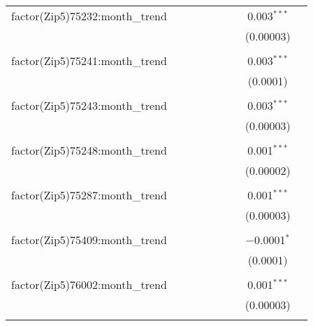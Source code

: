 \begin{table}[H]
{\begin{tabular}{@{\extracolsep{5pt}}lcccccccc}
  factor(Zip5)75232:month\_trend &  &  &  &  &  &  & 0.003$^{***}$ &  \\  

   &  &  &  &  &  &  & (0.00003) &  \\  

   & & & & & & & & \\  

  factor(Zip5)75241:month\_trend &  &  &  &  &  &  & 0.003$^{***}$ &  \\  

   &  &  &  &  &  &  & (0.0001) &  \\  

   & & & & & & & & \\  

  factor(Zip5)75243:month\_trend &  &  &  &  &  &  & 0.003$^{***}$ &  \\  

   &  &  &  &  &  &  & (0.00003) &  \\  

   & & & & & & & & \\  

  factor(Zip5)75248:month\_trend &  &  &  &  &  &  & 0.001$^{***}$ &  \\  

   &  &  &  &  &  &  & (0.00002) &  \\  

   & & & & & & & & \\  

  factor(Zip5)75287:month\_trend &  &  &  &  &  &  & 0.001$^{***}$ &  \\  

   &  &  &  &  &  &  & (0.00003) &  \\  

   & & & & & & & & \\  

  factor(Zip5)75409:month\_trend &  &  &  &  &  &  & $-$0.0001$^{*}$ &  \\  

   &  &  &  &  &  &  & (0.0001) &  \\  

   & & & & & & & & \\  

  factor(Zip5)76002:month\_trend &  &  &  &  &  &  & 0.001$^{***}$ &  \\  

   &  &  &  &  &  &  & (0.00003) &  \\  

   & & & & & & & & \\  


\end{tabular}}
\end{table}
